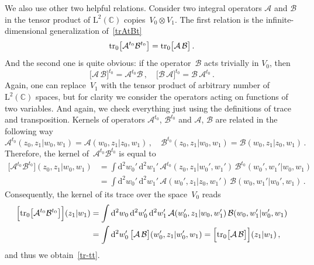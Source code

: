 \documentclass[a4paper,11pt]{article}
\newcommand{\tr}{\mathop{\rm tr}\nolimits}
\numberwithin{equation}{section}
\begin{document}
We also use other two helpful relations.
Consider two integral operators $\mathcal{A}$ and $\mathcal{B}$ in the tensor product of $\mathrm{L}^2(\mathbb{C})$ copies~$V_0\otimes V_1$.
The first relation is the infinite-dimensional generalization of~\eqref{trAtBt}
\begin{equation} \label{tr-tt}
	\tr_0\bigl[\mathcal{A}^{t_0}\mathcal{B}^{t_0}\bigr] = \tr_0\bigl[\mathcal{A}\,\mathcal{B}\bigr] \,.
\end{equation}
And the second one is quite obvious: if the operator~$\mathcal{B}$ acts trivially in $V_0$, then
\begin{equation} \label{transp-triv}
	\bigl[\mathcal{A}\,\mathcal{B}\bigr]^{t_0} = \mathcal{A}^{t_0} \mathcal{B} \,, \quad
	\bigl[\mathcal{B}\,\mathcal{A}\bigr]^{t_0} = \mathcal{B}\,\mathcal{A}^{t_0} \,.
\end{equation}
Again, one can replace~$V_1$ with the tensor product of arbitrary number of~$\mathrm{L}^2(\mathbb{C})$ spaces, but for clarity we consider the operators acting on functions of two variables.
And again, we check everything just using the definitions of trace and transposition.
Kernels of operators $\mathcal{A}^{t_0}$, $\mathcal{B}^{t_0}$ and $\mathcal{A}$, $\mathcal{B}$ are related in the following way
\begin{equation} \nonumber
	\mathcal{A}^{t_0}(z_0,z_1|w_0,w_1) = \mathcal{A}(w_0,z_1|z_0,w_1) \,,
	\quad
	\mathcal{B}^{t_0}(z_0,z_1|w_0,w_1) = \mathcal{B}(w_0,z_1|z_0,w_1) \,.
\end{equation}
Therefore, the kernel of~$\mathcal{A}^{t_0}\mathcal{B}^{t_0}$ is equal to
\begin{align}
	\nonumber
	\bigl[\mathcal{A}^{t_0}\mathcal{B}^{t_0}\bigr](z_0,z_1|w_0,w_1) & =
	\int \mathrm{d}^2 w_0'\,\mathrm{d}^2 w_1' \,
	\mathcal{A}^{t_0}(z_0,z_1|w_0',w_1') \, \mathcal{B}^{t_0}(w_0',w_1'|w_0,w_1) \\
	\nonumber
	& =
	\int \mathrm{d}^2 w_0'\,\mathrm{d}^2 w_1' \,
	\mathcal{A}(w_0',z_1|z_0,w_1') \, \mathcal{B}(w_0,w_1'|w_0',w_1) \,.
\end{align}
Consequently, the kernel of its trace over the space~$V_0$ reads
\begin{align}
	\nonumber
	\Bigl[\tr_0\bigl[\mathcal{A}^{t_0}\mathcal{B}^{t_0}\bigr]\Bigr](z_1|w_1)
	& =
	\int \mathrm{d}^2 w_0 \, \mathrm{d}^2 w_0'\,\mathrm{d}^2 w_1' \,
	\mathcal{A}(w_0',z_1|w_0,w_1') \, \mathcal{B}(w_0,w_1'|w_0',w_1) \\
	\nonumber
	& = \int \mathrm{d}^2 w_0' \, \bigl[\mathcal{A}\,\mathcal{B}\bigr](w_0',z_1|w_0',w_1)
	= \Bigl[\tr_0\bigl[\mathcal{A}\,\mathcal{B}\bigr]\Bigr](z_1|w_1) \,,
\end{align}
and thus we obtain~\eqref{tr-tt}.
\end{document}
